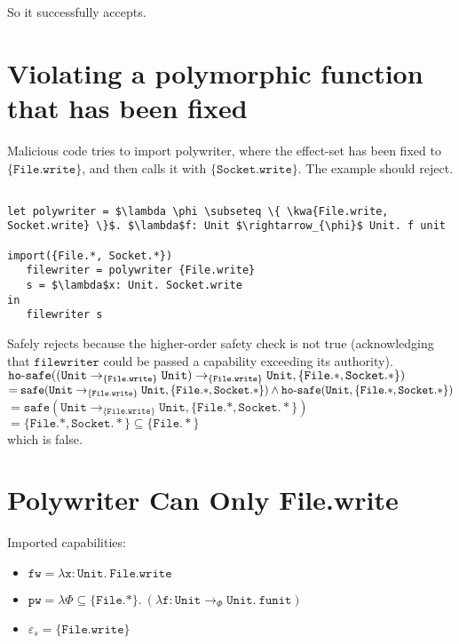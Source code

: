 \documentclass{llncs}
\newcommand{\keywadj}[1]{\mathtt{#1}}
\newcommand{\kwa}[1]{\keywadj{ #1 }}
\newcommand{\hyphen}{\hbox{-}}
\newcommand{\Unit}[0]{ \kwa{Unit} }
\newcommand{\safe}[2]{ \kwa{safe}(#1, #2) }
\newcommand{\hosafe}[2]{ \kwa{ho \hyphen safe}(#1, #2) }
\begin{document}
\noindent
So it successfully accepts.

\section{Violating a polymorphic function that has been fixed}

Malicious code tries to import polywriter, where the effect-set has been fixed to $\{ \kwa{File.write} \}$, and then calls it with $\kwa{ \{Socket.write\} }$. The example should reject.

\begin{lstlisting}

let polywriter = $\lambda \phi \subseteq \{ \kwa{File.write, Socket.write} \}$. $\lambda$f: Unit $\rightarrow_{\phi}$ Unit. f unit

import({File.*, Socket.*})
   filewriter = polywriter {File.write}
   s = $\lambda$x: Unit. Socket.write
in
   filewriter s
\end{lstlisting}

Safely rejects because the higher-order safety check is not true (acknowledging that $\kwa{filewriter}$ could be passed a capability exceeding its authority). \\

$\hosafe{(\Unit \rightarrow_{\kwa{\{File.write\}}} \Unit) \rightarrow_{\kwa{\{File.write\}}} \Unit}{\kwa{ \{File.*, Socket.*\} }}$ \\

$= \safe{\Unit \rightarrow_{\kwa{\{File.write\}}} \Unit}{\{\kwa{File.*, Socket.*}\}} \land \hosafe{\Unit}{\{\kwa{File.*, Socket.*}\}}$ \\

$= \safe{\Unit \rightarrow_{\kwa{\{File.write\}}} \Unit}{\{\kwa{File.*, Socket.*}\}}$ \\

$= \{\kwa{File.*, Socket.*}\} \subseteq \{ \kwa{File.*} \}$ \\

which is false.


\section{Polywriter Can Only File.write}

Imported capabilities:
\begin{itemize}
	\item $\kwa{fw = \lambda x: Unit.~File.write}$
	\item $\kwa{pw = \lambda \Phi \subseteq \{ File.* \}.~ (\lambda f: Unit \rightarrow_{\Phi} \Unit. ~f unit)}$
	\item $\varepsilon_s = \{\kwa{File.write}\}$
\end{itemize}
\end{document}
